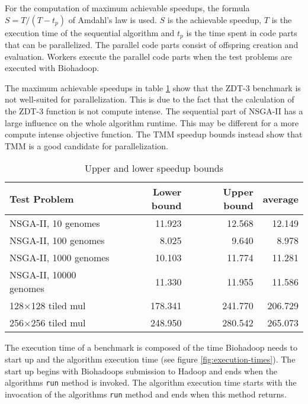 For the computation of maximum achievable speedups, the formula $S = T / (T - t_p)$ of Amdahl's law \cite{amdahl1967validity} is used. $S$ is the achievable speedup, $T$ is the execution time of the sequential algorithm and $t_p$ is the time spent in code parts that can be parallelized. The parallel code parts consist of offspring creation and evaluation. Workers execute the parallel code parts when the test problems are executed with Biohadoop.

The maximum achievable speedups in table \ref{table:speedup_bounds} show that the ZDT-3 benchmark is not well-suited for parallelization. This is due to the fact that the calculation of the ZDT-3 function is not compute intense. The sequential part of NSGA-II has a large influence on the whole algorithm runtime. This may be different for a more compute intense objective function. The TMM speedup bounds instead show that TMM is a good candidate for parallelization.


\begin{table}
  \centering
  \caption{Upper and lower speedup bounds}
  \begin{tabular}{lrrr}\toprule[2pt]
    Test Problem & Lower bound & Upper bound & average \\ \midrule
    NSGA-II, 10 genomes & 11.923 & 12.568 & 12.149 \\
    NSGA-II, 100 genomes & 8.025 & 9.640 & 8.978 \\
    NSGA-II, 1000 genomes & 10.103 & 11.774 & 11.281 \\
    NSGA-II, 10000 genomes & 11.330 & 11.955 & 11.586 \\
    128$\times$128 tiled mul & 178.341 & 241.770  & 206.729 \\
    256$\times$256 tiled mul & 248.950  & 280.542 & 265.073 \\ \bottomrule[2pt]
  \end{tabular}
  \label{table:speedup_bounds}
\end{table}

The execution time of a benchmark is composed of the time Biohadoop needs to start up and the algorithm execution time (see figure \ref{fig:execution-times}). The start up begins with Biohadoops submission to Hadoop and ends when the algorithms \texttt{run} method is invoked. The algorithm execution time starts with the invocation of the algorithms \texttt{run} method and ends when this method returns.

